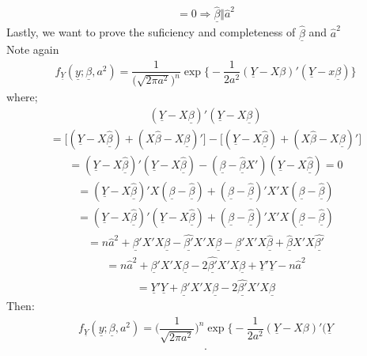 \documentclass[12pt]{article}
\numberwithin{equation}{section}
\begin{document}
\begin{eqnarray*}
= 0 \Longrightarrow \underline{\hat{\beta}} \Vert \hat{a}^{2}
\end{eqnarray*}
Lastly, we want to prove the suficiency and completeness of $\underline{\hat{\beta}}$ and $\hat{a}^{2}$\\
Note again 
\begin{eqnarray*}
f_{\underline{Y}}(\underline{y};\underline{\beta}, a^{2}) =\dfrac{1}{\Big(\sqrt{2\pi a^{2}}\Big)^{n}} \exp\bigg\{-\dfrac{1}{2a^{2}}(\underline{Y}-X\beta)'(\underline{Y}-x\underline{\beta})\bigg\}
\end{eqnarray*}
where;
\begin{eqnarray*}
(\underline{Y}-X\underline{\beta})'(\underline{Y}-X\underline{\beta})
\end{eqnarray*}
\begin{eqnarray*}
= \big[(\underline{Y}-X\underline{\hat{\beta}})+(X\hat{\beta}-X\underline{\beta})'\big] - \big[(\underline{Y}-X\underline{\hat{\beta}})+(X\hat{\beta}-X\underline{\beta})'\big]
\end{eqnarray*}
\begin{eqnarray*}
= (\underline{Y}-X\underline{\hat{\beta}})'(\underline{Y}-X\underline{\hat{\beta}}) - (\underline{\beta} -\hat{\underline{\beta}}X')(\underline{Y}-X\underline{\hat{\beta}}) = 0
\end{eqnarray*}
\begin{eqnarray*}
= (\underline{Y}-X\underline{\hat{\beta}})'X(\underline{\beta}-\hat{\underline{\beta}}) + (\underline{\beta}-\hat{\underline{\beta}})'X'X(\underline{\beta}-\hat{\underline{\beta}})
\end{eqnarray*}
\begin{eqnarray*}
 = (\underline{Y}-X\underline{\hat{\beta}})'(\underline{Y}-X\underline{\hat{\beta}}) + (\underline{\beta}-\hat{\underline{\beta}})'X'X(\underline{\beta}-\hat{\underline{\beta}})
\end{eqnarray*}
\begin{eqnarray*}
= n\hat{a}^{2} + \underline{\beta}'X'X\underline{\beta}-\underline{\hat{\beta'}}X'X\underline{\beta} - \underline{\beta}'X'X\underline{\hat{\beta}}+ \underline{\hat{\beta}}X'X\underline{\hat{\beta '}}
\end{eqnarray*}
\begin{eqnarray*}
= n\hat{a}^{2} + \underline{\beta}'X'X\underline{\beta}-2\underline{\hat{\beta'}}X'X\underline{\beta} + \underline{Y}'\underline{Y} - n\hat{a}^{2}
\end{eqnarray*}
\begin{eqnarray*}
 = \underline{Y}'\underline{Y} + \underline{\beta}'X'X\underline{\beta}-2\underline{\hat{\beta'}}X'X\underline{\beta}
\end{eqnarray*}
Then:
\begin{eqnarray*}
f_{\underline{Y}}(\underline{y};\underline{\beta}, a^{2}) =\Big(\dfrac{1}{\sqrt{2\pi a^{2}}}\Big)^{n} \exp\bigg\{-\dfrac{1}{2a^{2}}(\underline{Y}-X\beta)'(\underline{Y}
\end{eqnarray*}
\begin{eqnarray*}
.
\end{eqnarray*}
\end{document}
